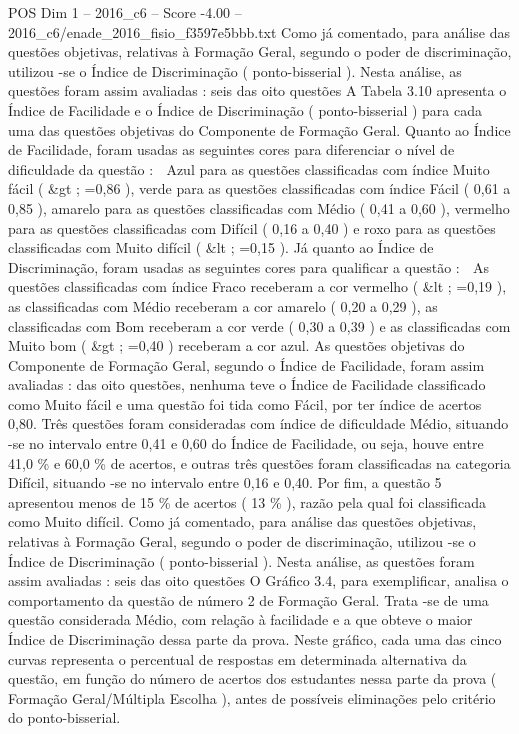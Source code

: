 \begin{textsample}{POS Dim 1 – 2016\_c6 – Score -4.00 – 2016\_c6/enade\_2016\_fisio\_f3597e5bbb.txt}
Como já comentado, para análise das questões objetivas, relativas à Formação Geral, segundo o poder de discriminação, utilizou -se o Índice de Discriminação ( ponto-bisserial ).
Nesta análise, as questões foram assim avaliadas : seis das oito questões A Tabela 3.10 apresenta o Índice de Facilidade e o Índice de Discriminação ( ponto-bisserial ) para cada uma das questões objetivas do Componente de Formação Geral.
Quanto ao Índice de Facilidade, foram usadas as seguintes cores para diferenciar o nível de dificuldade da questão :  Azul para as questões classificadas com índice Muito fácil ( \&gt ; =0,86 ), verde para as questões classificadas com índice Fácil ( 0,61 a 0,85 ), amarelo para as questões classificadas com Médio ( 0,41 a 0,60 ), vermelho para as questões classificadas com Difícil ( 0,16 a 0,40 ) e roxo para as questões classificadas com Muito difícil ( \&lt ; =0,15 ).
Já quanto ao Índice de Discriminação, foram usadas as seguintes cores para qualificar a questão :  As questões classificadas com índice Fraco receberam a cor vermelho ( \&lt ; =0,19 ), as classificadas com Médio receberam a cor amarelo ( 0,20 a 0,29 ), as classificadas com Bom receberam a cor verde ( 0,30 a 0,39 ) e as classificadas com Muito bom ( \&gt ; =0,40 ) receberam a cor azul.
As questões objetivas do Componente de Formação Geral, segundo o Índice de Facilidade, foram assim avaliadas : das oito questões, nenhuma teve o Índice de Facilidade classificado como Muito fácil e uma questão foi tida como Fácil, por ter índice de acertos 0,80.
Três questões foram consideradas com índice de dificuldade Médio, situando -se no intervalo entre 0,41 e 0,60 do Índice de Facilidade, ou seja, houve entre 41,0 \% e 60,0 \% de acertos, e outras três questões foram classificadas na categoria Difícil, situando -se no intervalo entre 0,16 e 0,40.
Por fim, a questão 5 apresentou menos de 15 \% de acertos ( 13 \% ), razão pela qual foi classificada como Muito difícil.
Como já comentado, para análise das questões objetivas, relativas à Formação Geral, segundo o poder de discriminação, utilizou -se o Índice de Discriminação ( ponto-bisserial ).
Nesta análise, as questões foram assim avaliadas : seis das oito questões O Gráfico 3.4, para exemplificar, analisa o comportamento da questão de número 2 de Formação Geral.
Trata -se de uma questão considerada Médio, com relação à facilidade e a que obteve o maior Índice de Discriminação dessa parte da prova.
Neste gráfico, cada uma das cinco curvas representa o percentual de respostas em determinada alternativa da questão, em função do número de acertos dos estudantes nessa parte da prova ( Formação Geral/Múltipla Escolha ), antes de possíveis eliminações pelo critério do ponto-bisserial.

\end{textsample}
